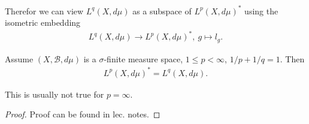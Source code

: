 \fi 
Therefor we can view \(L^q(X,d\mu)\) as a subspace of \(L^p(X,d\mu)^*\) using the isometric embedding
\begin{align*}
    L^q(X,d\mu) \rightarrow L^p(X,d\mu)^*, \ g\mapsto l_g.
\end{align*}
\begin{theorem}
    Assume \((X,\mathscr{B},d\mu)\) is a \(\sigma\)-finite measure space, \(1\leq p< \infty\), \(1/p+1/q=1\). Then 
    \begin{align*}
        L^p(X,d\mu)^* = L^q(X,d\mu).
    \end{align*}
\end{theorem}
\begin{remark}
    This is usually not true for \(p=\infty\).
\end{remark}
\ifdetailed
\begin{proof}
    Proof can be found in lec. notes.
\end{proof}
\fi 